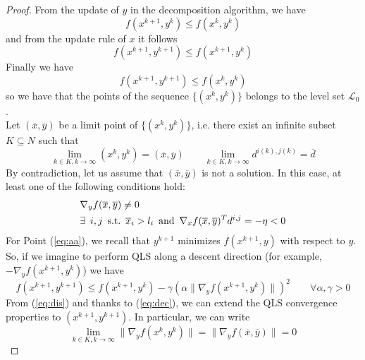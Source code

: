 \begin{proof}
From the update of $y$ in the decomposition algorithm, we have
\begin{equation}
f(x^{k+1}, y^{k}) \leq f(x^{k}, y^{k})
\end{equation}
and from the update rule of $x$ it follows
\begin{equation}\label{eq:dec}
f(x^{k+1}, y^{k+1}) \leq f(x^{k+1}, y^{k})
\end{equation}
Finally we have
\begin{equation}
f(x^{k+1}, y^{k+1}) \leq f(x^{k}, y^{k})
\end{equation}
so we have that the points of the sequence $\{(x^{k}, y^{k})\}$ belongs to the level set $\mathcal{L}_0$.\\
Let $(\overline{x},\overline{y})$ be a limit point of $\{(x^k, y^k)\}$, i.e. there exist an infinite subset $K \subseteq N$ such that
\begin{equation}\label{eq:asim}
\lim_{k \in K, k \rightarrow \infty} (x^k, y^k) = (\overline{x},\overline{y}) \qquad \lim_{k \in K, k \rightarrow \infty} d^{i(k),j(k)} = \overline{d}
\end{equation}
By contradiction, let us assume that $(\overline{x},\overline{y})$ is not a solution. In this case, at least one of the following conditions hold:
\begin{subequations}
\begin{align}
&\nabla_y f(\overline{x},\overline{y}) \neq 0  \label{eq:aa}\\
&\exists \enskip i, j \enskip  \text{s.t.} \enskip \overline{x}_i > l_i \enskip  \text{and} \enskip  \nabla_x f(\overline{x},\overline{y})^T d^{i,j} = -\eta < 0 \label{eq:bb}
\end{align}
\end{subequations}
For Point (\ref{eq:aa}), we recall that $y^{k+1}$ minimizes $f(x^{k+1},y)$ with respect to $y$. So, if we imagine to perform QLS along a descent direction (for example, $-\nabla_y f(x^{k+1},y^{k})$) we have
\begin{equation}\label{eq:dis}
f(x^{k+1}, y^{k+1}) \leq f(x^{k+1}, y^{k}) - \gamma (\alpha \parallel \nabla_y f(x^{k+1}, y^{k}) \parallel) ^2 \qquad \forall \alpha, \gamma > 0
\end{equation}
From (\ref{eq:dis}) and thanks to (\ref{eq:dec}), we can extend the QLS convergence properties to $(x^{k+1}, y^{k+1})$. In particular, we can write
\begin{equation}
\lim_{k \in K, k \rightarrow \infty} \parallel \nabla_y f(x^{k}, y^{k}) \parallel =  \parallel \nabla_y f(\overline{x},\overline{y}) \parallel = 0

\end{equation}
\end{proof}

